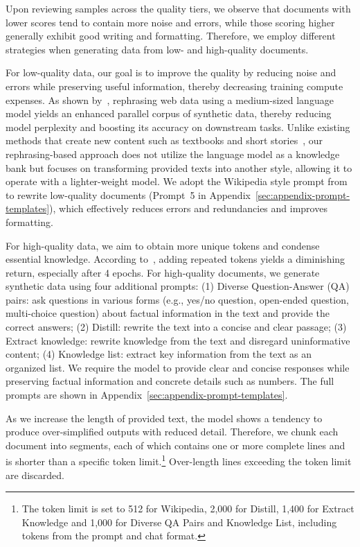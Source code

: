 \documentclass[11pt]{article}
\begin{document}
Upon reviewing samples across the quality tiers, we observe that documents with lower scores tend to contain more noise and errors, while those scoring higher generally exhibit good writing and formatting.
Therefore, we employ different strategies when generating data from low- and high-quality documents.

For low-quality data, our goal is to improve the quality by reducing noise and errors while preserving useful information, thereby decreasing training compute expenses. As shown by~\citet{maini2024rephrasing}, rephrasing web data using a medium-sized language model yields an enhanced parallel corpus of synthetic data, thereby reducing model perplexity and boosting its accuracy on downstream tasks.
Unlike existing methods that create new content such as textbooks and short stories~\cite{wang2023self,eldan2023tinystories,gunasekar2023textbooks}, our rephrasing-based approach does not utilize the language model as a knowledge bank but focuses on transforming provided texts into another style, allowing it to operate with a lighter-weight model.
We adopt the \textrm{Wikipedia} style prompt from~\citep{maini2024rephrasing}
to rewrite low-quality documents (Prompt~5 in Appendix~\ref{sec:appendix-prompt-templates}), which effectively reduces errors and redundancies and improves formatting.

For high-quality data, we aim to obtain more unique tokens and condense essential knowledge. According to~\citep{muennighoff2024scaling}, adding repeated tokens yields a diminishing return, especially after 4 epochs.
For high-quality documents, we generate synthetic data using four additional prompts:
(1) \textrm{Diverse Question-Answer (QA) pairs}: ask questions in various forms (e.g., yes/no question, open-ended question, multi-choice question) about factual information in the text and provide the correct answers;
(2) \textrm{Distill}: rewrite the text into a concise and clear passage;
(3) \textrm{Extract knowledge}: rewrite knowledge from the text and disregard uninformative content;
(4) \textrm{Knowledge list}: extract key information from the text as an organized list.
We require the model to provide clear and concise responses while preserving factual information and concrete details such as numbers.
The full prompts are shown in Appendix~\ref{sec:appendix-prompt-templates}.

As we increase the length of provided text, the model shows a tendency to produce over-simplified outputs with reduced detail. Therefore, we chunk each document into segments, each of which contains one or more complete lines and is shorter than a specific token limit.\footnote{The token limit is set to 512 for \textrm{Wikipedia}, 2,000 for \textrm{Distill}, 1,400 for \textrm{Extract Knowledge} and 1,000 for \textrm{Diverse QA Pairs} and \textrm{Knowledge List}, including tokens from the prompt and chat format.} Over-length lines exceeding the token limit are discarded.
\end{document}
